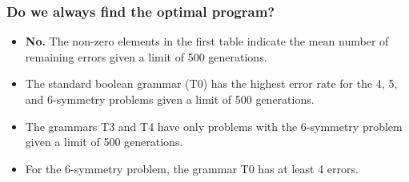 \begin{frame}
\frametitle{
Do we always find the optimal program?
}
\begin{itemize}
\item {\bf No.} The non-zero elements in the first table
         indicate the mean number of remaining errors given
         a limit of 500 generations.
\item The standard boolean grammar (T0) has the highest error rate
  for the 4, 5, and 6-symmetry problems given a limit of 500 generations.
\item The grammars T3 and T4 have only problems with the 6-symmetry problem
       given a limit of 500 generations.
\item For the 6-symmetry problem, the grammar T0 has at least 4 errors.
\end{itemize}
\end{frame}